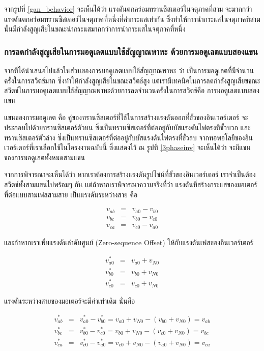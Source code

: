 \documentclass[11pt,a4paper]{article}
\begin{document}
จากรูปที่ \ref{gan_behavior} จะเห็นได้ว่า แรงดันตกคร่อมทรานซิสเตอร์ในจตุภาคที่สาม จะมากกว่าแรงดันตกคร่อมทรานซิสเตอร์ในจตุภาคที่หนึ่งที่ค่ากระแสเท่ากัน ซึ่งทำให้การนำกระแสในจตุภาคที่สามนั้นมีกำลังสูญเสียในขณะนำกระแสมากกว่าการนำกระแสในจตุภาคที่หนึ่ง

\subsubsection{การลดกำลังสูญเสียในการมอดูเลตแบบใช้สัญญาณพาหะ ด้วยการมอดูเลตแบบสองแขน}

จากที่ได้นำเสนอไปแล้วในส่วนของการมอดูเลตแบบใช้สัญญาณพาหะ ว่า เป็นการมอดูเลตที่มีจำนวนครั้งในการสวิตช์มาก ซึ่งทำให้กำลังสูญเสียในขณะสวิตช์สูง แต่เรามีเทคนิคในการลดกำลังสูญเสียขขณะสวิตช์ในการมอดูเลตแบบใช้สัญญาณพาหะด้วยการลดจำนวนครั้งในการสวิตช์คือ การมอดูเลตแบบสองแขน

แขนของการมอดูเลต คือ คู่ของทรานซิสเตอร์ที่ใช้ในการสร้างแรงดันออกที่ขั้วของอินเวอร์เตอร์ จะประกอบไปด้วยทรานซิสเตอร์ตัวบน ซึ่งเป็นทรานซิสเตอร์ที่ต่ออยู่กับบัสแรงดันไฟตรงที่ขั้วบวก และทรานซิสเตอร์ตัวล่าง ซึ่งเป็นทรานซิสเตอร์ที่ต่ออยู่กับบัสแรงดันไฟตรงที่ขั้วลบ จากทอพอโลยีของอินเวอร์เตอร์ที่เราเลือกใช้ในโครงงานฉบับนี้ ซึ่งแสดงไว้ ณ รูปที่ \ref{3phaseinv} จะเห็นได้ว่า จะมีแขนของการมอดูเลตทั้งหมดสามแขน

จากการพิจารณาจะเห็นได้ว่า หากเราต้องการสร้างแรงดันรูปไซน์ที่ขั้วของอินเวอร์เตอร์ เราจำเป็นต้องสวิตช์ทั้งสามแขนไปพร้อมๆ กัน แต่ถ้าหากเราพิจารณาความจริงที่ว่า แรงดันที่สร้างกระแสของมอเตอร์ที่ต่อแบบสามเฟสสามสาย เป็นแรงดันระหว่างสาย คือ

\begin{eqnarray}
    v_{ab} &=& v_{a0} - v_{b0} \\
    v_{bc} &=& v_{b0} - v_{c0} \\
    v_{ca} &=& v_{c0} - v_{a0}
\end{eqnarray}

และถ้าหากเราเพิ่มแรงดันลำดับศูนย์ (Zero-sequence Offset) ให้กับแรงดันเฟสของอินเวอร์เตอร์

\begin{eqnarray}
    v_{a0}^* &=& v_{a0} + v_{N0} \\
    v_{b0}^* &=& v_{b0} + v_{N0} \\
    v_{c0}^* &=& v_{c0} + v_{N0}
\end{eqnarray}

แรงดันระหว่างสายของมอเตอร์จะมีค่าเท่าเดิม นั่นคือ

\begin{eqnarray}
    v_{ab}^* &=& v_{a0}^* - v_{b0}^* = v_{a0} + v_{N0} - (v_{b0} + v_{N0}) = v_{ab} \\
    v_{bc}^* &=& v_{b0}^* - v_{c0}^* = v_{b0} + v_{N0} - (v_{c0} + v_{N0}) = v_{bc} \\
    v_{ca}^* &=& v_{c0}^* - v_{a0}^* = v_{c0} + v_{N0} - (v_{a0} + v_{N0}) = v_{ca}
\end{eqnarray}
\end{document}
